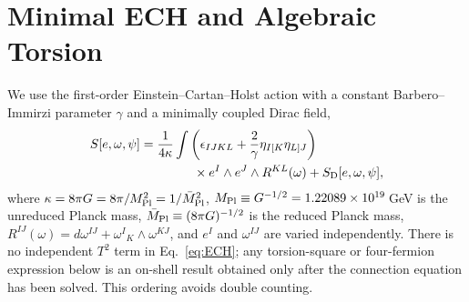\documentclass[aps,prd,twocolumn,superscriptaddress,preprintnumbers,nofootinbib,longbibliography,floatfix]{revtex4-2}
\newcommand{\MPl}{M_{\rm Pl}}
\newcommand{\fnl}{f_{\rm NL}}
\begin{document}

\section{Minimal ECH and Algebraic Torsion}\label{sec:theory}

We use the first-order Einstein--Cartan--Holst action with a constant
Barbero--Immirzi parameter $\gamma$ and a minimally coupled Dirac field,
\begin{align}\label{eq:ECH}
S[e,\omega,\psi] ={}& \frac{1}{4\kappa}\int
\left(\epsilon_{IJKL}+\frac{2}{\gamma}\eta_{I[K}\eta_{L]J}\right)\nonumber\\
&\hspace{1.0cm}\times e^I\wedge e^J\wedge R^{KL}(\omega)
+ S_{\rm D}[e,\omega,\psi],
\end{align}
where $\kappa=8\pi G=8\pi/M_{\rm Pl}^2=1/\bar M_{\rm Pl}^2$,
$M_{\rm Pl}\equiv G^{-1/2}=1.22089\times10^{19}\,$GeV is the unreduced Planck
mass, $\bar M_{\rm Pl}\equiv(8\pi G)^{-1/2}$ is the reduced Planck mass,
$R^{IJ}(\omega)=d\omega^{IJ}+\omega^I{}_K\wedge\omega^{KJ}$, and $e^I$ and
$\omega^{IJ}$ are varied independently.  There
is no independent $T^2$ term in Eq.~\eqref{eq:ECH}; any torsion-square or
four-fermion expression below is an on-shell result obtained only after the
connection equation has been solved.  This ordering avoids double counting.
\end{document}
